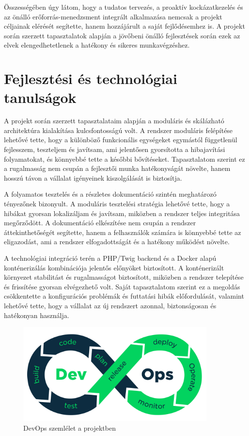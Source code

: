 Összességében úgy látom, hogy a tudatos tervezés, a proaktív kockázatkezelés és az önálló erőforrás-menedzsment
 integrált alkalmazása nemcsak a projekt céljainak elérését segítette, hanem hozzájárult a saját fejlődésemhez is. 
 A projekt során szerzett tapasztalatok alapján a jövőbeni önálló fejlesztések során ezek az elvek elengedhetetlenek a hatékony és sikeres munkavégzéshez.


\section{Fejlesztési és technológiai tanulságok}

A projekt során szerzett tapasztalataim alapján a moduláris és skálázható architektúra kialakítása kulcsfontosságú volt. 
A rendszer moduláris felépítése lehetővé tette, hogy a különböző funkcionális egységeket egymástól függetlenül fejlesszem, 
teszteljem és javítsam, ami jelentősen gyorsította a hibajavítási folyamatokat, és könnyebbé tette a későbbi bővítéseket. 
Tapasztalatom szerint ez a rugalmasság nem csupán a fejlesztői munka hatékonyságát növelte, hanem hosszú távon a vállalat igényeinek kiszolgálását is biztosítja.

A folyamatos tesztelés és a részletes dokumentáció szintén meghatározó tényezőnek bizonyult. 
A moduláris tesztelési stratégia lehetővé tette, hogy a hibákat gyorsan lokalizáljam és javítsam, 
miközben a rendszer teljes integritása megőrződött. A dokumentáció elkészítése nem csupán a rendszer 
áttekinthetőségét segítette, hanem a felhasználók számára is könnyebbé tette az eligazodást, ami a rendszer elfogadottságát és a hatékony működést növelte.

A technológiai integráció terén a PHP/Twig backend és a Docker alapú konténerizálás kombinációja 
jelentős előnyöket biztosított. A konténerizált környezet stabilitást és rugalmasságot biztosított, 
miközben a rendszer telepítése és frissítése gyorsan elvégezhető volt. Saját tapasztalatom szerint 
ez a megoldás csökkentette a konfigurációs problémák és futtatási hibák előfordulását, 
valamint lehetővé tette, hogy a vállalat az új rendszert azonnal, biztonságosan és hatékonyan használja.

\begin{figure}[H]
    \centering
    \includegraphics[width=100mm, keepaspectratio]{figures/devops.png}
    \caption{DevOps szemlélet a projektben}
    \label{fig:devops}
\end{figure}
